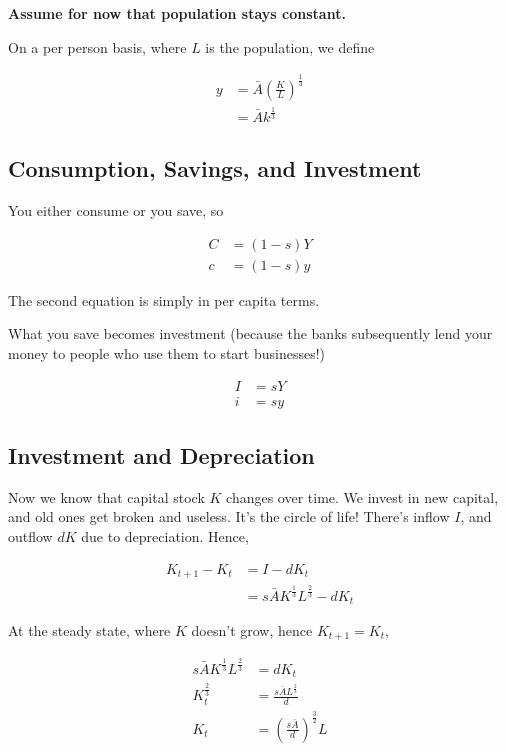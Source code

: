 \documentclass[11pt]{scrartcl}
\newcommand{\oneth}{\ensuremath{\frac{1}{3}}}
\newcommand{\twoth}{\ensuremath{\frac{2}{3}}}
\begin{document}
\textbf{Assume for now that population stays constant.}

On a per person basis, where $L$ is the population, we define

\begin{align*}
y &= \bar{A}\left(\frac{K}{L}\right)^{\oneth} \\
&= \bar{A}k^{\oneth}
\end{align*}

\subsection{Consumption, Savings, and Investment}

You either consume or you save, so

\begin{align*}
C &= (1-s)Y \\
c &= (1-s)y
\end{align*}

The second equation is simply in per capita terms. 

What you save becomes investment (because the banks subsequently lend your money to people who use them to start businesses!)

\begin{align*}
I &= sY \\
i &= sy 
\end{align*}

\subsection{Investment and Depreciation}

Now we know that capital stock $K$ changes over time. We invest in new capital, and old ones get broken and useless. It's the circle of life! There's inflow $I$, and outflow $dK$ due to depreciation. Hence,

\begin{align*}
K_{t+1} - K_t &= I - dK_t \\
&= s\bar{A}K^{\oneth}L^{\twoth} - dK_t
\end{align*}

At the steady state, where $K$ doesn't grow, hence $K_{t+1} = K_t$, 

\begin{align*}
s\bar{A}K^{\oneth}L^{\twoth} &= dK_t \\
K_t^{\twoth} &= \frac{s\bar{A}L^{\twoth}}{d} \\
K_t &= \left(\frac{s\bar{A}}{d}\right)^{\frac{3}{2}}L
\end{align*}
\end{document}
